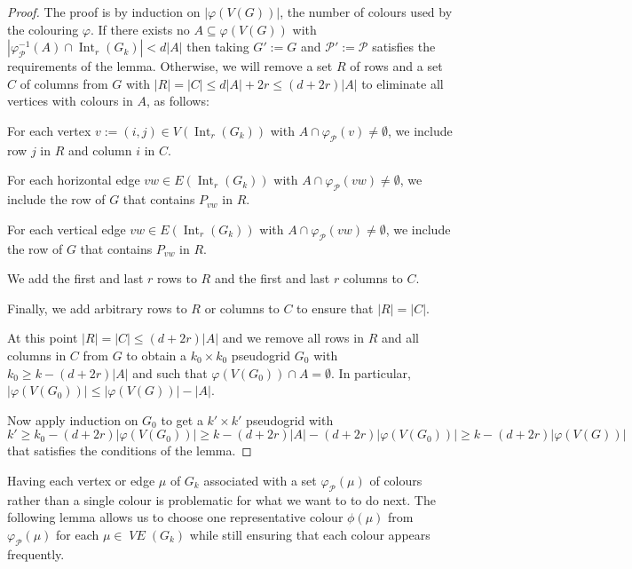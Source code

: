\documentclass{patmorin}
\DeclareMathOperator{\interior}{Int}
\DeclareMathOperator{\VE}{\mathit{VE}}
\begin{document}
\begin{proof}
  The proof is by induction on $|\varphi(V(G))|$, the number of colours used by the colouring $\varphi$.  If there exists no $A\subseteq \varphi(V(G))$ with $|\varphi_{\mathcal{P}}^{-1}(A)\cap\interior_r(G_k)| < d|A|$ then taking $G':=G$ and $\mathcal{P}':=\mathcal{P}$ satisfies the requirements of the lemma.  Otherwise, we will remove a set $R$ of rows and a set $C$ of columns from $G$ with $|R|=|C|\le d|A|+2r \le (d+2r)|A|$ to eliminate all vertices with colours in $A$, as follows:
  \begin{compactitem}
    \item For each vertex $v:=(i,j)\in V(\interior_r(G_{k}))$ with $A\cap\varphi_\mathcal{P}(v)\neq\emptyset$, we include row $j$ in $R$ and column $i$ in $C$.
    \item For each horizontal edge $vw\in E(\interior_r(G_{k}))$ with $A\cap\varphi_\mathcal{P}(vw)\neq\emptyset$, we include the row of $G$ that contains $P_{vw}$ in $R$.
    \item For each vertical edge $vw\in E(\interior_r(G_{k}))$ with $A\cap\varphi_\mathcal{P}(vw)\neq\emptyset$, we include the row of $G$ that contains $P_{vw}$ in $R$.
    \item We add the first and last $r$ rows to $R$ and the first and last $r$ columns to $C$.
    \item Finally, we add arbitrary rows to $R$ or columns to $C$ to ensure that $|R|=|C|$.
  \end{compactitem}
  At this point $|R|=|C|\le (d+2r)|A|$ and we remove all rows in $R$ and all columns in $C$ from $G$ to obtain a $k_0\times k_0$ pseudogrid $G_0$ with $k_0\ge k-(d+2r)|A|$ and such that $\varphi(V(G_0))\cap A=\emptyset$.  In particular, $|\varphi(V(G_0))|\le |\varphi(V(G))|-|A|$.

  Now apply induction on $G_0$ to get a $k'\times k'$ pseudogrid with
  \[
    k'\ge k_0-(d+2r)|\varphi(V(G_0))|
      \ge k-(d+2r)|A|-(d+2r)|\varphi(V(G_0))|
      \ge k - (d+2r)|\varphi(V(G))|
  \]
  that satisfies the conditions of the lemma.
\end{proof}


Having each vertex or edge $\mu$ of $G_k$ associated with a set $\varphi_\mathcal{P}(\mu)$ of colours rather than a single colour is problematic for what we want to to do next.  The following lemma allows us to choose one representative colour $\phi(\mu)$ from $\varphi_{\mathcal{P}}(\mu)$ for each $\mu\in \VE(G_k)$ while still ensuring that each colour appears frequently.
\end{document}
